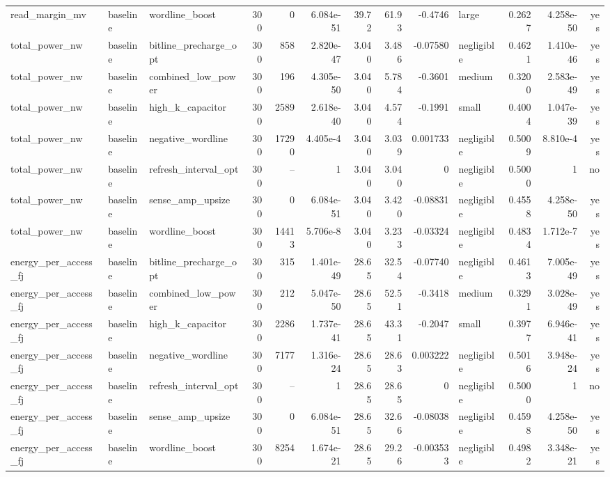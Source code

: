 \begin{table}[!t]
\begin{tabular}{lllrrrrrrlrrr}
read\_margin\_mv & baseline & wordline\_boost & 300 & 0 & 6.084e-51 & 39.72 & 61.93 & -0.4746 & large & 0.2627 & 4.258e-50 & yes \\
total\_power\_nw & baseline & bitline\_precharge\_opt & 300 & 858 & 2.820e-47 & 3.040 & 3.486 & -0.07580 & negligible & 0.4621 & 1.410e-46 & yes \\
total\_power\_nw & baseline & combined\_low\_power & 300 & 196 & 4.305e-50 & 3.040 & 5.784 & -0.3601 & medium & 0.3200 & 2.583e-49 & yes \\
total\_power\_nw & baseline & high\_k\_capacitor & 300 & 2589 & 2.618e-40 & 3.040 & 4.574 & -0.1991 & small & 0.4004 & 1.047e-39 & yes \\
total\_power\_nw & baseline & negative\_wordline & 300 & 17290 & 4.405e-4 & 3.040 & 3.039 & 0.001733 & negligible & 0.5009 & 8.810e-4 & yes \\
total\_power\_nw & baseline & refresh\_interval\_opt & 300 & -- & 1 & 3.040 & 3.040 & 0 & negligible & 0.5000 & 1 & no \\
total\_power\_nw & baseline & sense\_amp\_upsize & 300 & 0 & 6.084e-51 & 3.040 & 3.420 & -0.08831 & negligible & 0.4558 & 4.258e-50 & yes \\
total\_power\_nw & baseline & wordline\_boost & 300 & 14413 & 5.706e-8 & 3.040 & 3.233 & -0.03324 & negligible & 0.4834 & 1.712e-7 & yes \\
energy\_per\_access\_fj & baseline & bitline\_precharge\_opt & 300 & 315 & 1.401e-49 & 28.65 & 32.54 & -0.07740 & negligible & 0.4613 & 7.005e-49 & yes \\
energy\_per\_access\_fj & baseline & combined\_low\_power & 300 & 212 & 5.047e-50 & 28.65 & 52.51 & -0.3418 & medium & 0.3291 & 3.028e-49 & yes \\
energy\_per\_access\_fj & baseline & high\_k\_capacitor & 300 & 2286 & 1.737e-41 & 28.65 & 43.31 & -0.2047 & small & 0.3977 & 6.946e-41 & yes \\
energy\_per\_access\_fj & baseline & negative\_wordline & 300 & 7177 & 1.316e-24 & 28.65 & 28.63 & 0.003222 & negligible & 0.5016 & 3.948e-24 & yes \\
energy\_per\_access\_fj & baseline & refresh\_interval\_opt & 300 & -- & 1 & 28.65 & 28.65 & 0 & negligible & 0.5000 & 1 & no \\
energy\_per\_access\_fj & baseline & sense\_amp\_upsize & 300 & 0 & 6.084e-51 & 28.65 & 32.66 & -0.08038 & negligible & 0.4598 & 4.258e-50 & yes \\
energy\_per\_access\_fj & baseline & wordline\_boost & 300 & 8254 & 1.674e-21 & 28.65 & 29.26 & -0.003533 & negligible & 0.4982 & 3.348e-21 & yes \\

\end{tabular}
\end{table}
